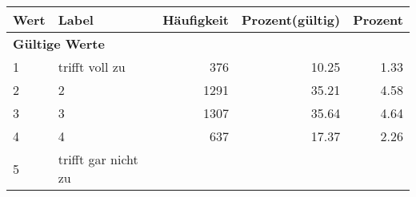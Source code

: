      \begin{longtable}{lXrrr}
     \toprule
     \textbf{Wert} & \textbf{Label} & \textbf{Häufigkeit} & \textbf{Prozent(gültig)} & \textbf{Prozent} \\
     \endhead
     \midrule
     \multicolumn{5}{l}{\textbf{Gültige Werte}}\\

     1 &
     \multicolumn{1}{X}{ trifft voll zu   } &


       \num{376} &
       \num[round-mode=places,round-precision=2]{10.25} &
         \num[round-mode=places,round-precision=2]{1.33} \\

     2 &
     \multicolumn{1}{X}{ 2   } &


       \num{1291} &
       \num[round-mode=places,round-precision=2]{35.21} &
         \num[round-mode=places,round-precision=2]{4.58} \\

     3 &
     \multicolumn{1}{X}{ 3   } &


       \num{1307} &
       \num[round-mode=places,round-precision=2]{35.64} &
         \num[round-mode=places,round-precision=2]{4.64} \\

     4 &
     \multicolumn{1}{X}{ 4   } &


       \num{637} &
       \num[round-mode=places,round-precision=2]{17.37} &
         \num[round-mode=places,round-precision=2]{2.26} \\

     5 &
     \multicolumn{1}{X}{ trifft gar nicht zu   } &



\end{longtable}
